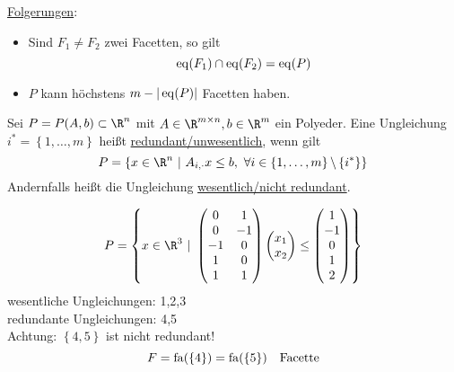 \underline{Folgerungen}:
\begin{itemize}
	\item Sind $F_{1} \neq F_{2}$ zwei Facetten, so gilt
		\begin{equation*}
			\operatorname{eq}(F_{1}) \cap \operatorname{eq}(F_{2}) = \operatorname{eq}(P)
		\end{equation*}
	\item $P$ kann höchstens $m-|\operatorname{eq}(P)|$ Facetten haben.
\end{itemize}
\begin{definition}
	Sei $P = P(A,b) \subset \R^n$ mit $A \in \R^{m \times n}, b \in \R^m$ ein Polyeder.
	Eine Ungleichung $i^* = \left\{1,\dots ,m \right\}$ heißt \underline{redundant/unwesentlich}, wenn gilt
	\begin{equation*}
		P = \left\{ x \in \R^n\ |\ A_{i,\cdot}x \leq b,\ \forall i\in\left\{1,\dots ,m \right\}\backslash \left\{i^* \right\} \right\}
	\end{equation*}
	Andernfalls heißt die Ungleichung \underline{wesentlich/nicht redundant}.
\end{definition}
\begin{beispiel}
	\begin{align*}
		P = \left\{ x \in \R^3\ |\ 
			\begin{pmatrix}
				0 & 1 \\
				0 & -1 \\
				-1 & 0 \\
				1 & 0 \\
				1 & 1 
			\end{pmatrix}
			\begin{pmatrix}
				x_{1}\\
				x_{2}
			\end{pmatrix}
			\leq 
			\begin{pmatrix}
				1\\
				-1\\
				0\\
				1\\
				2
			\end{pmatrix}
		 \right\}
	\end{align*}
	wesentliche Ungleichungen: 1,2,3\\
	redundante Ungleichungen: 4,5\\
	Achtung: $\left\{4,5 \right\}$ ist nicht redundant!
	\begin{equation*}
		F = \operatorname{fa}(\left\{4 \right\}) = \operatorname{fa}(\left\{5 \right\}) \quad \text{Facette}
	\end{equation*}
\end{beispiel}
